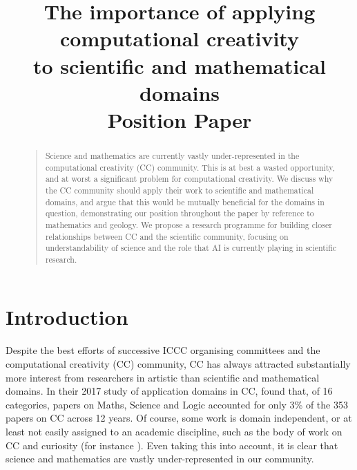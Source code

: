 \documentclass[letterpaper]{article}
\title{The importance of applying computational creativity\\ to
  scientific and mathematical domains\\
Position Paper}
\begin{document}
 
\maketitle
\begin{abstract}
\begin{quote}
  Science and mathematics are currently vastly under-represented in
  the computational creativity (CC) community. This is at best a
  wasted opportunity, and at worst a significant problem for
  computational creativity. We discuss why the CC community should
  apply their work to scientific and mathematical domains, and argue
  that this would be mutually beneficial for the domains in question,
  demonstrating our position throughout the paper by reference to
  mathematics and geology. We propose a research programme for
  building closer relationships between CC and the scientific
  community, focusing on understandability of science and the role
  that AI is currently playing in scientific research.
\end{quote}
\end{abstract}

\section{Introduction}

Despite the best efforts of successive ICCC organising committees and
the computational creativity (CC) community, CC has always attracted
substantially more interest from researchers in artistic than
scientific and mathematical domains. In their 2017 study of
application domains in CC, \cite{loughran17} found that, of 16
categories, papers on Maths, Science and Logic accounted for only 3\%
of the 353 papers on CC across 12 years. Of course, some work is
domain independent, or at least not easily assigned to an academic
discipline, such as the body of work on CC and curiosity (for instance
\cite{grace}). Even taking this into account, it is clear that science
and mathematics are vastly under-represented in our community.
\end{document}

